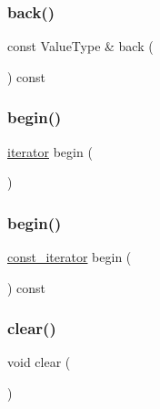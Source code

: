 \subsubsection{\texorpdfstring{back()}{back()}\hspace{0.1cm}{\footnotesize\ttfamily [2/2]}}
{\footnotesize\ttfamily const Value\+Type \& back (\begin{DoxyParamCaption}{ }\end{DoxyParamCaption}) const}

\mbox{\label{classLinkedList_ad69bd11391be1a1dba5c8202259664f8}} 
\subsubsection{\texorpdfstring{begin()}{begin()}\hspace{0.1cm}{\footnotesize\ttfamily [1/2]}}
{\footnotesize\ttfamily \mbox{\hyperlink{classLinkedList_a50754c96f45bbb0f50e145fd70de6615}{iterator}} begin (\begin{DoxyParamCaption}{ }\end{DoxyParamCaption})\hspace{0.3cm}{\ttfamily [inline]}}

\mbox{\label{classLinkedList_a29305669b60ca1680752e2fc3592ba99}} 
\subsubsection{\texorpdfstring{begin()}{begin()}\hspace{0.1cm}{\footnotesize\ttfamily [2/2]}}
{\footnotesize\ttfamily \mbox{\hyperlink{classLinkedList_a3b9d37bc4aeea14213d403a3b30a230f}{const\+\_\+iterator}} begin (\begin{DoxyParamCaption}{ }\end{DoxyParamCaption}) const\hspace{0.3cm}{\ttfamily [inline]}}

\mbox{\label{classLinkedList_ac8bb3912a3ce86b15842e79d0b421204}} 
\subsubsection{\texorpdfstring{clear()}{clear()}}
{\footnotesize\ttfamily void clear (\begin{DoxyParamCaption}{ }\end{DoxyParamCaption})}

